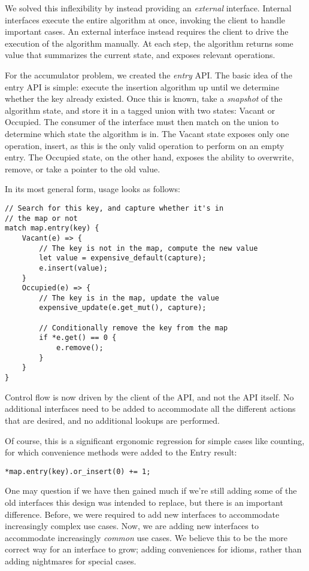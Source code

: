 We solved this inflexibility by instead providing an \emph{external} interface.
Internal interfaces execute the entire algorithm at once, invoking the client to
handle important cases. An external interface instead requires the client to drive the
execution of the algorithm manually. At each step, the algorithm returns some
value that summarizes the current state, and exposes relevant operations.

For the accumulator problem, we created the \emph{entry} API. The basic idea of the
entry API is simple: execute the insertion algorithm up until we determine
whether the key already existed. Once this is known, take a \emph{snapshot} of
the algorithm state, and store it in a tagged union with two states: Vacant or
Occupied. The consumer of the interface must then match on the union to determine
which state the algorithm is in. The Vacant state exposes only one operation,
insert, as this is the only valid operation to perform on an empty entry.
The Occupied state, on the other hand, exposes the ability to overwrite, remove,
or take a pointer to the old value.

In its most general form, usage looks as follows:

\begin{verbatim}
// Search for this key, and capture whether it's in
// the map or not
match map.entry(key) {
    Vacant(e) => {
        // The key is not in the map, compute the new value
        let value = expensive_default(capture);
        e.insert(value);
    }
    Occupied(e) => {
        // The key is in the map, update the value
        expensive_update(e.get_mut(), capture);

        // Conditionally remove the key from the map
        if *e.get() == 0 {
            e.remove();
        }
    }
}
\end{verbatim}

Control flow is now driven by the client of the API, and not the API itself.
No additional interfaces need to be added to accommodate all the different
actions that are desired, and no additional lookups are performed.

Of course, this is a significant ergonomic regression for simple cases like
counting, for which convenience methods were added to the Entry result:

\begin{verbatim}
*map.entry(key).or_insert(0) += 1;
\end{verbatim}

One may question if we have then gained much if we're still adding some of
the old interfaces this design was intended to replace, but there is an important
difference. Before, we were required to add new interfaces to accommodate increasingly
complex use cases. Now, we are adding new interfaces to accommodate increasingly
\emph{common} use cases. We believe this to be the more correct way for an interface to
grow; adding conveniences for idioms, rather than adding nightmares for special cases.


